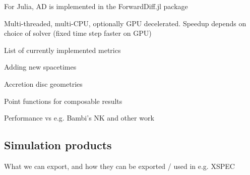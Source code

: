 For Julia, AD is implemented in the ForwardDiff.jl package \citep{RevelsLubinPapamarkou2016}

Multi-threaded, multi-CPU, optionally GPU decelerated. Speedup depends on choice of solver (fixed time step faster on GPU)

List of currently implemented metrics

Adding new spacetimes

Accretion disc geometries

Point functions for composable results

Performance vs e.g. Bambi's NK and other work

\subsection{Simulation products}

What we can export, and how they can be exported / used in e.g. XSPEC

